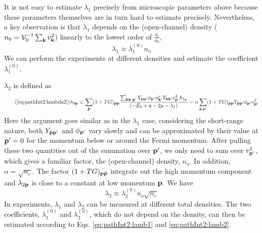 \begin{unsure}
It is not easy to estimate $\lambda_{1}$ precisely from  microscopic parameters above because these parameters themselves are  in turn hard to  estimate precisely.  Nevertheless, a key observation is that $\lambda_1$ depends on the (open-channel) density ($n_{0}={\mathcal{V}_{0}^{-1}}\sum_{\mathbf{k}}v_{\mathbf{k}}^2$) linearly to the lowest order of $\frac{a_{c}}{a_{0}}$, 
\begin{equation}\label{eq:pathInt2:lamb1}
\lambda_1\approx\lambda_1^{(0)}n_{o}
\end{equation}  
We can perform the experiments at different densities and estimate the coefficient $\lambda_1^{(0)}$. 


 $\lambda_2$ is defined as
\begin{equation}\tag{\ref{eq:pathInt2:lambda2}}
\lambda_{2\vp}\equiv\sum_{\tilde\vp}(1+TG)_{\vp\tilde\vp}\frac{\sum_{\vk\vk{'}\vp'} Y_{\tilde\vp\vp'}{\phi_{\vp'}}{\phi_{\vk'}^{*}}{Y_{\vk\vk'}}v_{\vp'}^{2}{h_{1_{\vk}}}}
		{\br{-E_{b}+\eta-2\mu-\lambda_{1}}}{}
		=\alpha\sum_{\tilde\vp\,\vp'}(1+TG)_{\vp\tilde\vp} Y_{\tilde\vp\vp'}{\phi_{\vp'}}v_{\vp'}^{2}
\end{equation}
Here the argument goes similar as in the $\lambda_{1}$ case, considering the short-range nature, both  $Y_{\tilde{\mathbf{p}}\mathbf{p}'}$ and $\phi_{\mathbf{p}'}$ vary slowly and can be approximated by their value at $\mathbf{p}'=0$ for the momentum below or around the Fermi momentum.  After pulling these two quantities out of the summation over $\mathbf{p}'$, we only need to sum over   $v_{\mathbf{p}'}^{2}$, which gives a familiar factor,  the (open-channel) density, $n_{o}$. In addition, $\alpha=\sqrt{n_{c}}$.  The factor $(1+TG)_{\mathbf{p}\tilde{\mathbf{p}}}$ integrate out the high momentum component and $\lambda_{2\mathbf{p}}$ is close to a constant at low momentum $\mathbf{p}$.  We have 
\begin{equation}\label{eq:pathInt2:lamb2}
\lambda_2\approx\lambda_2^{(0)}n_{o}\sqrt{n_{c}}
\end{equation}
  In experiments, $\lambda_{1}$ and $\lambda_{2}$ can be measured at different total densities.   The two coefficients, $\lambda_{1}^{(0)}$  and $\lambda_{2}^{(0)}$,  which do not depend on the density, can then be estimated according to Eqs. \ref{eq:pathInt2:lamb1} and \ref{eq:pathInt2:lamb2}. 






\end{unsure}
